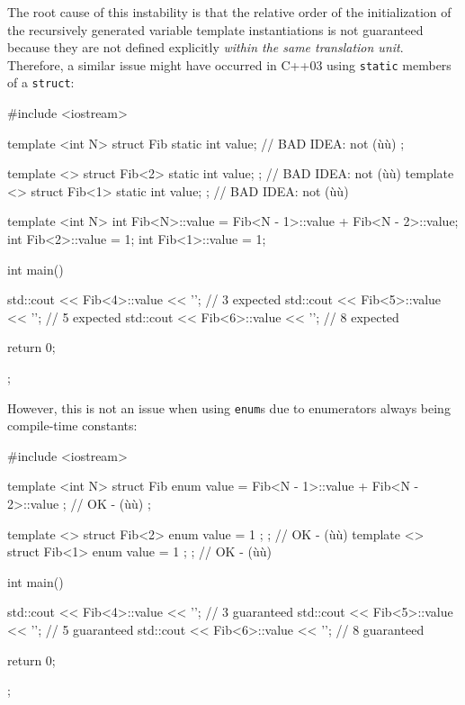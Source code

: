 \noindent The root cause of this instability is
that the relative order of the initialization of the recursively generated variable template instantiations 
is not guaranteed because they are not defined explicitly \emph{within the same translation
unit}.  Therefore, a similar issue might have occurred in C++03 using \lstinline!static! members of a \lstinline!struct!: 

\begin{emcppslisting}[language=C++]
#include <iostream>

template <int N> struct Fib
{
    static int value;                             // BAD IDEA: not (ù{}ù)
};

template <> struct Fib<2> { static int value; };  // BAD IDEA: not (ù{}ù)
template <> struct Fib<1> { static int value; };  // BAD IDEA: not (ù{}ù)

template <int N> int Fib<N>::value = Fib<N - 1>::value + Fib<N - 2>::value;
int Fib<2>::value = 1;
int Fib<1>::value = 1;

int main()
{
    std::cout << Fib<4>::value << '\n';  // 3 expected
    std::cout << Fib<5>::value << '\n';  // 5 expected
    std::cout << Fib<6>::value << '\n';  // 8 expected

    return 0;
};
\end{emcppslisting}
    
\noindent However, this is not an issue when using \lstinline!enum!s due to enumerators always being compile-time constants:

\begin{emcppslisting}[language=C++]
#include <iostream>

template <int N> struct Fib
{
    enum { value = Fib<N - 1>::value + Fib<N - 2>::value };  // OK - (ù{}ù)
};

template <> struct Fib<2> { enum { value = 1 }; };           // OK - (ù{}ù)
template <> struct Fib<1> { enum { value = 1 }; };           // OK - (ù{}ù)

int main()
{
    std::cout << Fib<4>::value << '\n';  // 3 guaranteed
    std::cout << Fib<5>::value << '\n';  // 5 guaranteed
    std::cout << Fib<6>::value << '\n';  // 8 guaranteed

    return 0;
};
\end{emcppslisting}
    
